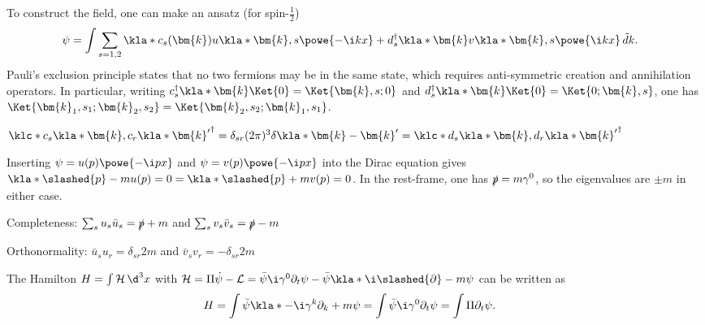 \documentclass[english, parskip=full]{scrbook}
\newcommand{\note}[1]{\begin{tcolorbox}[colback=colorbackgroundnote,colframe=colornote, breakable,enhanced]#1\end{tcolorbox}}
\begin{document}
To construct the field, one can make an ansatz (for spin-$\frac{1}{2}$)
\begin{align}
\psi &= \int \sum_{s=1,2} \kla*{c_s(\bm{k}) u\kla*{\bm{k},s} \powe{-\i kx} + d_s^\dagger\kla*{\bm{k}} v\kla*{\bm{k},s}\powe{\i kx}}\,\tilde{d}k.
\end{align}
Pauli's exclusion principle states that no two fermions may be in the same state, which requires anti-symmetric creation and annihilation operators.
In particular, writing $c_s^\dagger\kla*{\bm{k}}\Ket{0} = \Ket{\bm{k},s; 0}$ and $d_s^\dagger\kla*{\bm{k}} \Ket{0} = \Ket{0; \bm{k},s}$, one has $\Ket{\bm{k}_1,s_1; \bm{k}_2,s_2} = \Ket{\bm{k}_2,s_2;\bm{k}_1,s_1}$.
\note{$\klc*{c_s\kla*{\bm{k}}, c_r\kla*{\bm{k}'}^\dagger} = \delta_{sr} (2\pi)^3 \delta\kla*{\bm{k} - \bm{k}'} = \klc*{d_s\kla*{\bm{k}}, d_r\kla*{\bm{k}'}^\dagger}$}
Inserting $\psi=u(p)\powe{-\i px}$ and $\psi=v(p)\powe{-\i px}$ into the Dirac equation gives $\kla*{\slashed{p} - m}u(p)=0=\kla*{\slashed{p}+m}v(p)=0$.
In the rest-frame, one has $\slashed{p} = m\gamma^0$, so the eigenvalues are $\pm m$ in either case.
\note{Completeness: $\sum_s u_s\bar{u}_s = \slashed{p}+m$ and $\sum_s v_s\bar{v}_s = \slashed{p}-m$

Orthonormality: $\bar{u}_s u_r = \delta_{sr} 2m$ and $\bar{v}_s v_r = -\delta_{sr} 2m$
}
The Hamilton $H=\int \mathcal{H}\,\d^3x$ with $\mathcal{H}=\Pi \dot{\psi} - \mathcal{L} = \bar{\psi} \i\gamma^0 \partial_t \psi - \bar{\psi} \kla*{\i \slashed{\partial} - m}\psi$ can be written as
\begin{align}
H &= \int \bar{\psi} \kla*{-\i \gamma^k \partial_k + m}\psi = \int \bar{\psi} \i \gamma^0\partial_t\psi = \int \Pi \partial_t\psi.
\end{align}
\end{document}

